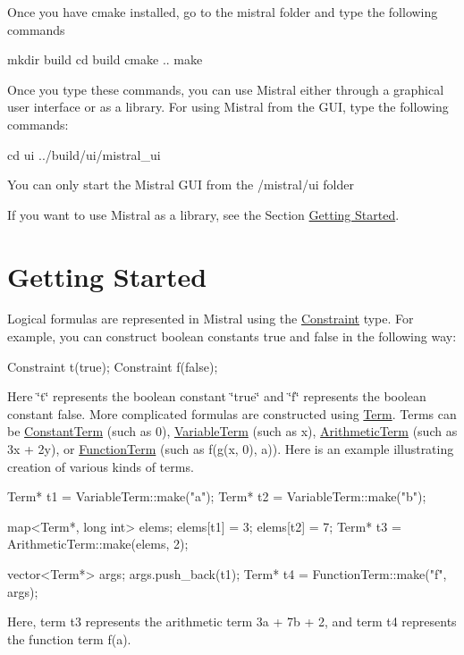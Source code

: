 \-Once you have cmake installed, go to the mistral folder and type the following commands \begin{DoxyVerb}
mkdir build
cd build
cmake ..
make
\end{DoxyVerb}


\-Once you type these commands, you can use \-Mistral either through a graphical user interface or as a library. \-For using \-Mistral from the \-G\-U\-I, type the following commands\-:

\begin{DoxyVerb}
cd ui
../build/ui/mistral_ui
\end{DoxyVerb}


\-You can only start the \-Mistral \-G\-U\-I from the /mistral/ui folder

\-If you want to use \-Mistral as a library, see the \-Section \hyperlink{index_start}{\-Getting \-Started}.\hypertarget{index_start}{}\section{\-Getting Started}\label{index_start}
\-Logical formulas are represented in \-Mistral using the \hyperlink{classConstraint}{\-Constraint} type. \-For example, you can construct boolean constants true and false in the following way\-: \begin{DoxyVerb}
Constraint t(true);
Constraint f(false);
\end{DoxyVerb}
 \-Here \char`\"{}t\char`\"{} represents the boolean constant \char`\"{}true\char`\"{} and \char`\"{}f\char`\"{} represents the boolean constant false. \-More complicated formulas are constructed using \hyperlink{classTerm}{\-Term}. \-Terms can be \hyperlink{classConstantTerm}{\-Constant\-Term} (such as 0), \hyperlink{classVariableTerm}{\-Variable\-Term} (such as x), \hyperlink{classArithmeticTerm}{\-Arithmetic\-Term} (such as 3x + 2y), or \hyperlink{classFunctionTerm}{\-Function\-Term} (such as f(g(x, 0), a)). \-Here is an example illustrating creation of various kinds of terms. \begin{DoxyVerb}
   Term* t1 = VariableTerm::make("a");
   Term* t2 = VariableTerm::make("b");

   map<Term*, long int> elems;
   elems[t1] = 3;
   elems[t2] = 7;
   Term* t3 = ArithmeticTerm::make(elems, 2);

   vector<Term*> args;
   args.push_back(t1);
   Term* t4 = FunctionTerm::make("f", args);

\end{DoxyVerb}
 \-Here, term t3 represents the arithmetic term 3a + 7b + 2, and term t4 represents the function term f(a).

